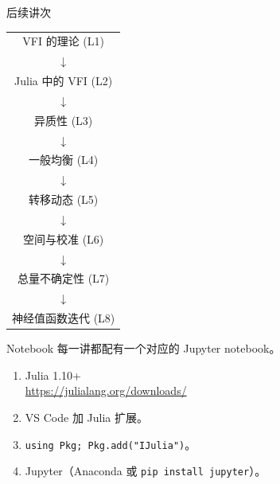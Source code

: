 \documentclass[10pt,aspectratio=169]{beamer}
\begin{document}
\begin{frame}{后续讲次}
\centering
\footnotesize
\setlength{\tabcolsep}{4pt}
\renewcommand{\arraystretch}{0.9}
\begin{tabular}{c}
VFI 的理论 \quad (L1) \\
$\downarrow$ \\
Julia 中的 VFI \quad (L2) \\
$\downarrow$ \\
异质性 \quad (L3) \\
$\downarrow$ \\
一般均衡 \quad (L4) \\
$\downarrow$ \\
转移动态 \quad (L5) \\
$\downarrow$ \\
空间与校准 \quad (L6) \\
$\downarrow$ \\
总量不确定性 \quad (L7) \\
$\downarrow$ \\
\alert{神经值函数迭代} \quad (L8)
\end{tabular}
\end{frame}

\begin{frame}{Notebook}
  每一讲都配有一个对应的 Jupyter notebook。
  \begin{enumerate}
    \item Julia 1.10+\\
      \footnotesize\url{https://julialang.org/downloads/}
    \item \normalsize VS Code 加 Julia 扩展。
    \item \texttt{using Pkg; Pkg.add("IJulia")}。
    \item Jupyter（Anaconda 或 \texttt{pip install jupyter}）。
  \end{enumerate}
\end{frame}
\end{document}
